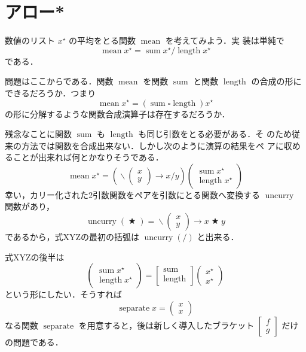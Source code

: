 \documentclass[a5paper,twoside,fleqn,draft]{jsbook}
\newcommand{\mAnonParam}{\diamond}
\newcommand{\mSpecialFunc}[1]{#1}
\DeclareMathOperator{\mLength}{\mSpecialFunc{length}}
\DeclareMathOperator{\mMean}{\mSpecialFunc{mean}}
\DeclareMathOperator{\mSeparate}{\mSpecialFunc{separate}}
\DeclareMathOperator{\mSum}{\mSpecialFunc{sum}}
\DeclareMathOperator{\mUncurry}{\mSpecialFunc{uncurry}}
\DeclareMathOperator{\mBinOp}{\bigstar}
\DeclareMathOperator{\mLambda}{\backslash}
\DeclareMathOperator{\mLambdaArrow}{\rightarrow}
\newcommand{\mPairWith}[2]{\begin{pmatrix}#1\\#2\end{pmatrix}}
\newcommand{\mList}[1]{{#1}^\mathrm{\star}}
\begin{document}
\section{アロー*}

数値のリスト $\mList{x}$ の平均をとる関数 $\mMean$ を考えてみよう．実
装は単純で
\begin{equation}
  \mMean\mList{x}=\mSum\mList{x}/\mLength\mList{x}
\end{equation}
である．

問題はここからである．関数 $\mMean$ を関数 $\mSum$ と関数 $\mLength$
の合成の形にできるだろうか．つまり
\begin{equation}
  \mMean\mList{x}=(\mSum\square\mLength)\mList{x}
\end{equation}
の形に分解するような関数合成演算子は存在するだろうか．

残念なことに関数 $\mSum$ も $\mLength$ も同じ引数をとる必要がある．そ
のため従来の方法では関数を合成出来ない．しかし次のように演算の結果をペ
アに収めることが出来れば何とかなりそうである．
\begin{equation}
  \mMean\mList{x}
  =%
  \left(\mLambda\mPairWith{x}{y}\mLambdaArrow x/y\right)
  \begin{pmatrix}
    \mSum\mList{x}\\
    \mLength\mList{x}
  \end{pmatrix}
\end{equation}
幸い，カリー化された2引数関数をペアを引数にとる関数へ変換する
$\mUncurry$ 関数があり，
\begin{equation}
  \mUncurry(\mBinOp)=\mLambda\mPairWith{x}{y}\mLambdaArrow x\mBinOp y
\end{equation}
であるから，式XYZの最初の括弧は $\mUncurry(/)$ と出来る．

式XYZの後半は
\begin{equation}
  \mPairWith{\mSum\mList{x}}{\mLength\mList{x}}
  =\begin{bmatrix}
  \mSum\\
  \mLength
  \end{bmatrix}
  \mPairWith{\mList{x}}{\mList{x}}
\end{equation}
という形にしたい．そうすれば
\begin{equation}
  \mSeparate x
  =\mPairWith{x}{x}
\end{equation}
なる関数 $\mSeparate$ を用意すると，後は新しく導入したブラケット
$\begin{bmatrix}f\\g\end{bmatrix}$ だけの問題である．
\end{document}
